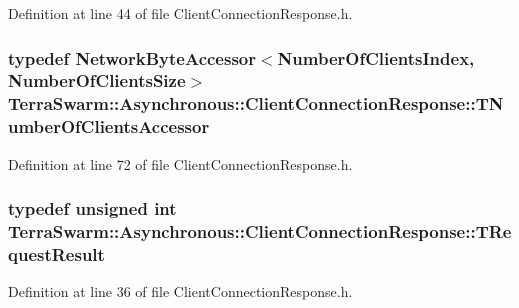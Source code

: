Definition at line 44 of file Client\-Connection\-Response.\-h.

\hypertarget{class_terra_swarm_1_1_asynchronous_1_1_client_connection_response_a6740a3389ab57cb4968a15ecf405fd8e}{
\subsubsection[{T\-Number\-Of\-Clients\-Accessor}]{\setlength{\rightskip}{0pt plus 5cm}typedef {\bf Network\-Byte\-Accessor}$<${\bf Number\-Of\-Clients\-Index}, {\bf Number\-Of\-Clients\-Size}$>$ {\bf Terra\-Swarm\-::\-Asynchronous\-::\-Client\-Connection\-Response\-::\-T\-Number\-Of\-Clients\-Accessor}\hspace{0.3cm}{\ttfamily [private]}}}\label{class_terra_swarm_1_1_asynchronous_1_1_client_connection_response_a6740a3389ab57cb4968a15ecf405fd8e}


Definition at line 72 of file Client\-Connection\-Response.\-h.

\hypertarget{class_terra_swarm_1_1_asynchronous_1_1_client_connection_response_a55a4d4527b877bde0e74da223157a62a}{
\subsubsection[{T\-Request\-Result}]{\setlength{\rightskip}{0pt plus 5cm}typedef unsigned int {\bf Terra\-Swarm\-::\-Asynchronous\-::\-Client\-Connection\-Response\-::\-T\-Request\-Result}}}\label{class_terra_swarm_1_1_asynchronous_1_1_client_connection_response_a55a4d4527b877bde0e74da223157a62a}


Definition at line 36 of file Client\-Connection\-Response.\-h.

